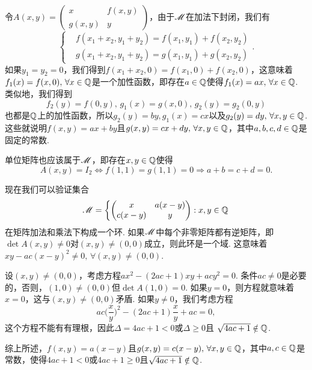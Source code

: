 \begin{solution}
  令$A(x,y)=\begin{pmatrix}
    x & f(x,y) \\
    g(x,y) & y
  \end{pmatrix}$，由于$\mathscr M$在加法下封闭，我们有
  \[
    \left\{
      \begin{aligned}
        & f(x_1 + x_2, y_1 + y_2) = f(x_1,y_1) + f(x_2,y_2) \\
        & g(x_1 + x_2, y_1 + y_2) = g(x_1,y_1) + g(x_2,y_2)
      \end{aligned}
    \right..
  \]
  如果$y_1=y_2=0$，我们得到$f(x_1+x_2,0)=f(x_1,0)+f(x_2,0)$，这意味着$f_1(x)=f(x,0),\,\forall x\in\mathbb Q$是一个加性函数，即存在$a\in\mathbb Q$使得$f_1(x)=ax,\,\forall x\in\mathbb Q$. 类似地，我们得到
  \[
    f_2(y) = f(0,y),\,g_1(x) = g(x,0),\, g_2(y) = g_2(0,y)
  \]
  也都是$\mathbb Q$上的加性函数，所以$g_2(y)=by,g_1(x)=cx$以及$g_2(y)=dy,\,\forall x,y\in\mathbb Q$. 这些就说明$f(x,y)=ax+by$且$g(x,y)=cx+dy,\,\forall x,y\in\mathbb Q$，其中$a,b,c,d\in\mathbb Q$是固定的常数.

  单位矩阵也应该属于$\mathscr M$，即存在$x,y\in\mathbb Q$使得
  \[
    A(x,y) = I_2 \Leftrightarrow f(1,1) = g(1,1) = 0 \Rightarrow a + b = c + d = 0.
  \]

  现在我们可以验证集合
  \[
    \MM = \left\{
      \begin{pmatrix}
        x & a(x-y) \\
        c(x-y) & y
      \end{pmatrix}:x,y\in\MQ
    \right.
  \]
  在矩阵加法和乘法下构成一个环. 如果$\mathscr M$中每个非零矩阵都有逆矩阵，即$\det A(x,y)\ne0$对$(x,y)\ne(0,0)$成立，则此环是一个域. 这意味着$xy-ac(x-y)^2\ne0,\,\forall
   (x,y)\ne(0,0)$.

   设$(x,y)\ne(0,0)$，考虑方程$ax^2-(2ac+1)xy+acy^2=0$. 条件$ac\ne0$是必要的，否则，$(1,0)\ne(0,0)$但$\det A(1,0)=0$. 如果$y=0$，则方程就意味着$x=0$，这与$(x,y)\ne(0,0)$矛盾. 如果$y\ne0$，我们考虑方程
   \[
     ac \Big( \frac xy \Big)^2 - (2ac+1)\frac xy + ac = 0,
   \]
   这个方程不能有有理根，因此$\varDelta=4ac+1<0$或$\varDelta\ge0$且
   $\sqrt{4ac+1}\notin \mathbb Q$.

   综上所述，$f(x,y)=a(x-y)$且$g(x,y)=c(x-y),\,\forall x,y\in\mathbb Q$，其中$a,c\in\mathbb Q$是常数，使得$4ac+1<0$或$4ac+1\ge0$且$\sqrt{4ac+1}\notin\mathbb Q$.
\end{solution}

